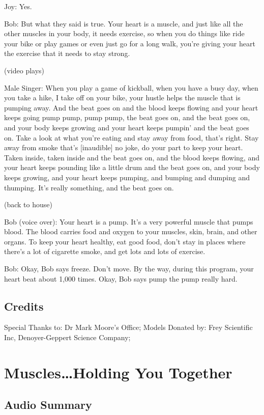 Joy: Yes.

Bob: But what they said is true. Your heart is a muscle, and just like all the other muscles in your body, it needs exercise, so when you do things like ride your bike or play games or even just go for a long walk, you're giving your heart the exercise that it needs to stay strong.

(video plays)

Male Singer: When you play a game of kickball, when you have a busy day, when you take a hike, I take off on your bike, your hustle helps the muscle that is pumping away. And the beat goes on and the blood keeps flowing and your heart keeps going pump pump, pump pump, the beat goes on, and the beat goes on, and your body keeps growing and your heart keeps pumpin' and the beat goes on. Take a look at what you're eating and stay away from food, that's right. Stay away from smoke that's [inaudible] no joke, do your part to keep your heart. Taken inside, taken inside and the beat goes on, and the blood keeps flowing, and your heart keeps pounding like a little drum and the beat goes on, and your body keeps growing, and your heart keeps pumping, and bumping and dumping and thumping. It's really something, and the beat goes on.

(back to house)

Bob (voice over): Your heart is a pump. It's a very powerful muscle that pumps blood. The blood carries food and oxygen to your muscles, skin, brain, and other organs. To keep your heart healthy, eat good food, don't stay in places where there's a lot of cigarette smoke, and get lots and lots of exercise.

Bob: Okay, Bob says freeze. Don't move. By the way, during this program, your heart beat about 1,000 times. Okay, Bob says pump the pump really hard.

\subsection{Credits}

Special Thanks to: Dr Mark Moore's Office;
Models Donated by: Frey Scientific Inc, Denoyer-Geppert Science Company;

\section{Muscles\dots Holding You Together}

\subsection{Audio Summary}

